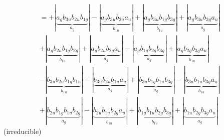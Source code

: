 \documentclass{article}
\begin{document}
\begin{multline*}
\end{multline*}\begin{multline*}
=+\left|\underbrace{a_{g} b_{3u} b_{2u} b_{1g}}_{a_{g}}\right|-\left|\underbrace{a_{g} b_{3u} b_{2u} a_{u}}_{b_{1u}}\right|+\left|\underbrace{a_{g} b_{3u} b_{1g} b_{3g}}_{b_{1u}}\right|+\left|\underbrace{a_{g} b_{3u} b_{3g} a_{u}}_{a_{g}}\right|\\
+\left|\underbrace{a_{g} b_{2u} b_{1g} b_{2g}}_{b_{1u}}\right|+\left|\underbrace{a_{g} b_{2u} b_{2g} a_{u}}_{a_{g}}\right|-\left|\underbrace{a_{g} b_{1g} b_{2g} b_{3g}}_{a_{g}}\right|+\left|\underbrace{a_{g} b_{2g} b_{3g} a_{u}}_{b_{1u}}\right|\\
-\left|\underbrace{b_{3u} b_{2u} b_{1g} b_{1u}}_{b_{1u}}\right|-\left|\underbrace{b_{3u} b_{2u} b_{1u} a_{u}}_{a_{g}}\right|+\left|\underbrace{b_{3u} b_{1g} b_{1u} b_{3g}}_{a_{g}}\right|-\left|\underbrace{b_{3u} b_{1u} b_{3g} a_{u}}_{b_{1u}}\right|\\
+\left|\underbrace{b_{2u} b_{1g} b_{1u} b_{2g}}_{a_{g}}\right|-\left|\underbrace{b_{2u} b_{1u} b_{2g} a_{u}}_{b_{1u}}\right|+\left|\underbrace{b_{1g} b_{1u} b_{2g} b_{3g}}_{b_{1u}}\right|+\left|\underbrace{b_{1u} b_{2g} b_{3g} a_{u}}_{a_{g}}\right|
\end{multline*}(irreducible)\\ \\
\vspace{0.5cm}
\end{document}
